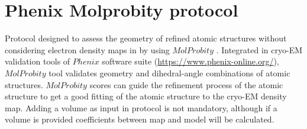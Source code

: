 \section{Phenix Molprobity protocol}
\label{app:molprobityProtocol}%
Protocol designed to assess the geometry of refined atomic structures without considering electron density maps in \scipion by using $MolProbity$ \citep{davis2004}. Integrated in cryo-EM validation tools of $Phenix$ software suite (\url{https://www.phenix-online.org/}), $MolProbity$ tool validates geometry and dihedral-angle combinations of atomic structures. $MolProbity$ scores can guide the refinement process of the atomic structure to get a good fitting of the atomic structure to the cryo-EM density map. Adding a volume as input in  protocol is not mandatory, although if a volume is provided  coefficients between map and model will be calculated.\\

